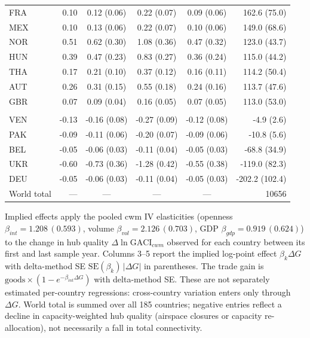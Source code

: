 \begin{table}[H]
\begin{threeparttable}
\begin{tabular}{lrcccr}
FRA & 0.10 & 0.12 (0.06) & 0.22 (0.07) & 0.09 (0.06) & 162.6 (75.0) \\
MEX & 0.10 & 0.13 (0.06) & 0.22 (0.07) & 0.10 (0.06) & 149.0 (68.6) \\
NOR & 0.51 & 0.62 (0.30) & 1.08 (0.36) & 0.47 (0.32) & 123.0 (43.7) \\
HUN & 0.39 & 0.47 (0.23) & 0.83 (0.27) & 0.36 (0.24) & 115.0 (44.2) \\
THA & 0.17 & 0.21 (0.10) & 0.37 (0.12) & 0.16 (0.11) & 114.2 (50.4) \\
AUT & 0.26 & 0.31 (0.15) & 0.55 (0.18) & 0.24 (0.16) & 113.7 (47.6) \\
GBR & 0.07 & 0.09 (0.04) & 0.16 (0.05) & 0.07 (0.05) & 113.0 (53.0) \\
\addlinespace
\multicolumn{6}{l}{\emph{Connectivity decliners (bottom 5)}}\\
VEN & -0.13 & -0.16 (0.08) & -0.27 (0.09) & -0.12 (0.08) & -4.9 (2.6) \\
PAK & -0.09 & -0.11 (0.06) & -0.20 (0.07) & -0.09 (0.06) & -10.8 (5.6) \\
BEL & -0.05 & -0.06 (0.03) & -0.11 (0.04) & -0.05 (0.03) & -68.8 (34.9) \\
UKR & -0.60 & -0.73 (0.36) & -1.28 (0.42) & -0.55 (0.38) & -119.0 (82.3) \\
DEU & -0.05 & -0.06 (0.03) & -0.11 (0.04) & -0.05 (0.03) & -202.2 (102.4) \\
\midrule
World total & --- & --- & --- & --- & 10656 \\
\bottomrule
\end{tabular}
\begin{tablenotes}\scriptsize
\item Implied effects apply the pooled cwm IV elasticities (openness
$\beta_{int}=1.208\,(0.593)$, volume $\beta_{vol}=2.126\,(0.703)$, GDP $\beta_{gdp}=0.919\,(0.624)$) to the change in hub quality
$\Delta\ln\mathrm{GACI}_{cwm}$ observed for each country between its first and
last sample year. Columns 3--5 report the implied log-point effect
$\beta_k\Delta G$ with delta-method SE $\mathrm{SE}(\beta_k)\,|\Delta G|$ in
parentheses. The trade gain is
$\text{goods}\times(1-e^{-\beta_{int}\Delta G})$ with delta-method SE. These are
not separately estimated per-country regressions: cross-country variation enters
only through $\Delta G$. World total is summed over all 185 countries; negative
entries reflect a decline in capacity-weighted hub quality (airspace closures or
capacity re-allocation), not necessarily a fall in total connectivity.
\end{tablenotes}
\end{threeparttable}
\end{table}

